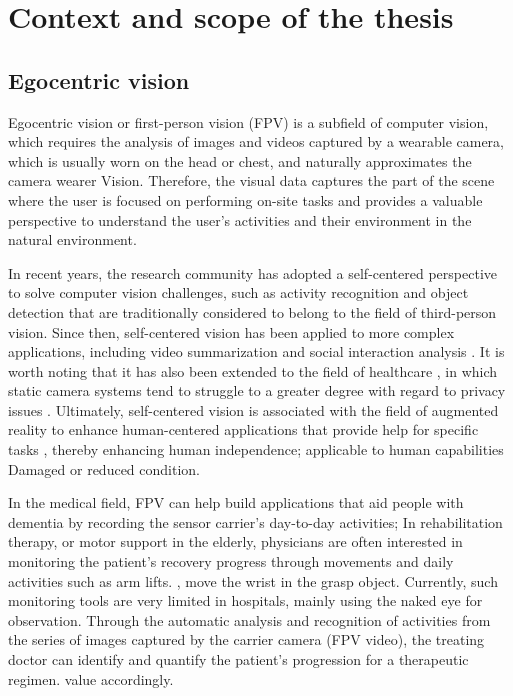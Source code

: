 \section{Context and scope of the thesis}
\subsection{Egocentric vision}
Egocentric vision or first-person vision (FPV) is a subfield of computer vision, which requires the analysis of images and videos captured by a wearable camera, which is usually worn on the head or chest, and naturally approximates the camera wearer Vision. Therefore, the visual data captures the part of the scene where the user is focused on performing on-site tasks and provides a valuable perspective to understand the user's activities and their environment in the natural environment.

In recent years, the research community has adopted a self-centered perspective to solve computer vision challenges, such as activity recognition \cite{10.1109/ICCV.2011.6126269} and object detection \cite{5995444} that are traditionally considered to belong to the field of third-person vision. Since then, self-centered vision has been applied to more complex applications, including video summarization \cite{6247820} and social interaction analysis \cite{7780657}. It is worth noting that it has also been extended to the field of healthcare \cite{wearable}, in which static camera systems tend to struggle to a greater degree with regard to privacy issues \cite{6091176}. Ultimately, self-centered vision is associated with the field of augmented reality to enhance human-centered applications that provide help for specific tasks \cite{10.1145/3041164.3041185}, thereby enhancing human independence; applicable to human capabilities Damaged or reduced condition.

In the medical field, FPV can help build applications that aid people with dementia by recording the sensor carrier's day-to-day activities; In rehabilitation therapy, or motor support in the elderly, physicians are often interested in monitoring the patient's recovery progress through movements and daily activities such as arm lifts. , move the wrist in the grasp object. Currently, such monitoring tools are very limited in hospitals, mainly using the naked eye for observation. Through the automatic analysis and recognition of activities from the series of images captured by the carrier camera (FPV video), the treating doctor can identify and quantify the patient's progression for a therapeutic regimen. value accordingly.

